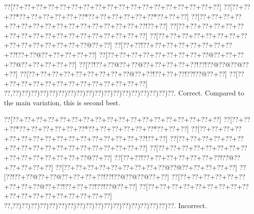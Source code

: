 \documentclass[a5paper]{article}
\begin{document}
\begin{center}
{\goo
\0??[\0??+\0??+\0??+\0??+\0??+\0??+\0??+\0??+\0??+\0??+\0??+\0??+\0??+\0??+\0??+\0??+\0??+\0??]
\0??[\0??+\0??+\0??*\0??+\0??+\0??+\0??+\0??+\0??*\0??+\0??+\0??+\0??+\0??+\0??*\0??+\0??+\0??]
\0??[\0??+\0??+\0??+\0??+\0??+\0??+\0??+\0??+\0??+\0??+\0??+\0??+\0??+\0??+\0??+\0??!\0??+\0??]
\0??[\0??+\0??+\0??+\0??+\0??+\0??+\0??+\0??+\0??+\0??+\0??+\0??+\0??+\0??+\0??+\0??+\0??+\0??]
\0??[\0??+\0??+\0??+\0??+\0??+\0??+\0??+\0??+\0??+\0??+\0??+\0??+\0??+\0??+\0??@\0??+\0??]
\0??[\0??+\0??!\0??+\0??+\0??+\0??+\0??+\0??+\0??+\0??+\0??!\0??+\0??@\0??+\0??+\0??+\0??+\0??]
\0??[\0??+\0??+\0??+\0??+\0??+\0??+\0??+\0??+\0??@\0??+\0??+\0??+\0??@\0??+\0??+\0??+\0??+\0??]
\0??[\0??!\0??+\0??@\0??+\0??@\0??+\0??+\0??+\0??+\0??!\0??!\0??@\0??@\0??@\0??+\0??]
\0??[\0??+\0??+\0??+\0??+\0??+\0??+\0??+\0??+\0??@\0??+\0??!\0??+\0??+\0??!\0??!\0??@\0??+\0??]
\0??[\0??+\0??+\0??+\0??+\0??+\0??+\0??+\0??+\0??+\0??+\0??+\0??+\0??]
\0??,\0??)\0??)\0??)\0??)\0??)\0??)\0??)\0??)\0??)\0??)\0??)\0??)\0??)\0??)\0??)\0??)\0??)\0??.
}
Correct. Compared to the main variation, this is second best.

\end{center}
\begin{center}
{\goo
\0??[\0??+\0??+\0??+\0??+\0??+\0??+\0??+\0??+\0??+\0??+\0??+\0??+\0??+\0??+\0??+\0??+\0??+\0??]
\0??[\0??+\0??+\0??*\0??+\0??+\0??+\0??+\0??+\0??*\0??+\0??+\0??+\0??+\0??+\0??*\0??+\0??+\0??]
\0??[\0??+\0??+\0??+\0??+\0??+\0??+\0??+\0??+\0??+\0??+\0??+\0??+\0??+\0??+\0??+\0??!\0??+\0??]
\0??[\0??+\0??+\0??+\0??+\0??+\0??+\0??+\0??+\0??+\0??+\0??+\0??+\0??+\0??+\0??+\0??+\0??+\0??]
\0??[\0??+\0??+\0??+\0??+\0??+\0??+\0??+\0??+\0??+\0??+\0??+\0??+\0??+\0??+\0??@\0??+\0??]
\0??[\0??+\0??!\0??+\0??+\0??+\0??+\0??+\0??+\0??!\0??@\0??+\0??+\0??+\0??+\0??]
\0??[\0??+\0??+\0??+\0??+\0??+\0??+\0??+\0??+\0??@\0??@\0??+\0??+\0??+\0??+\0??]
\0??[\0??!\0??+\0??@\0??+\0??@\0??+\0??+\0??+\0??!\0??!\0??@\0??@\0??@\0??+\0??]
\0??[\0??+\0??+\0??+\0??+\0??+\0??+\0??+\0??+\0??@\0??+\0??!\0??+\0??+\0??!\0??!\0??@\0??+\0??]
\0??[\0??+\0??+\0??+\0??+\0??+\0??+\0??+\0??+\0??+\0??+\0??+\0??+\0??+\0??+\0??+\0??+\0??+\0??]
\0??,\0??)\0??)\0??)\0??)\0??)\0??)\0??)\0??)\0??)\0??)\0??)\0??)\0??)\0??)\0??)\0??)\0??)\0??.
}
Incorrect. 

\end{center}
\end{document}
